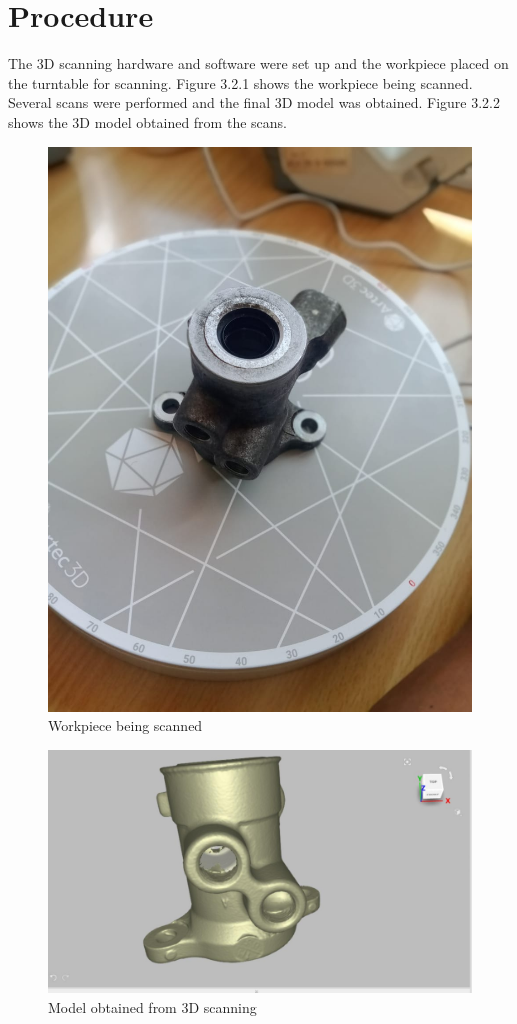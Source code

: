\section{Procedure}
The 3D scanning hardware and software were set up and the workpiece placed on the turntable for scanning. Figure 3.2.1 shows the workpiece being scanned. Several scans were performed and the final 3D model was obtained. Figure 3.2.2 shows the 3D model obtained from the scans.
\begin{center}
 	\begin{figure}[!h]
 	\centering
 	\includegraphics[width=0.4\linewidth]{Figures/Figure 2}
 	\caption[Scanning]{Workpiece being scanned}
 	\end{figure}
 \end{center}
 \begin{center}
 	\begin{figure}[!h]
 	\centering
 	\includegraphics[width=0.8\linewidth]{Figures/Figure 1}
 	\caption[Scanned 3D model]{Model obtained from 3D scanning}
 	\end{figure}
 \end{center}
 